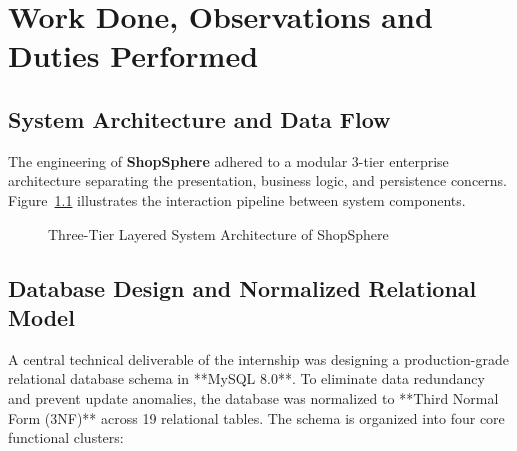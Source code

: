 \chapter{Work Done, Observations and Duties Performed}
\label{ch:work_done}

\section{System Architecture and Data Flow}
The engineering of \textbf{ShopSphere} adhered to a modular 3-tier enterprise architecture separating the presentation, business logic, and persistence concerns. Figure~\ref{fig:arch_flow} illustrates the interaction pipeline between system components.

\begin{figure}[H]
\centering
\begin{center}
\end{center}
\caption{Three-Tier Layered System Architecture of ShopSphere}
\label{fig:arch_flow}
\end{figure}

\section{Database Design and Normalized Relational Model}
A central technical deliverable of the internship was designing a production-grade relational database schema in **MySQL 8.0**. To eliminate data redundancy and prevent update anomalies, the database was normalized to **Third Normal Form (3NF)** across 19 relational tables. The schema is organized into four core functional clusters:

